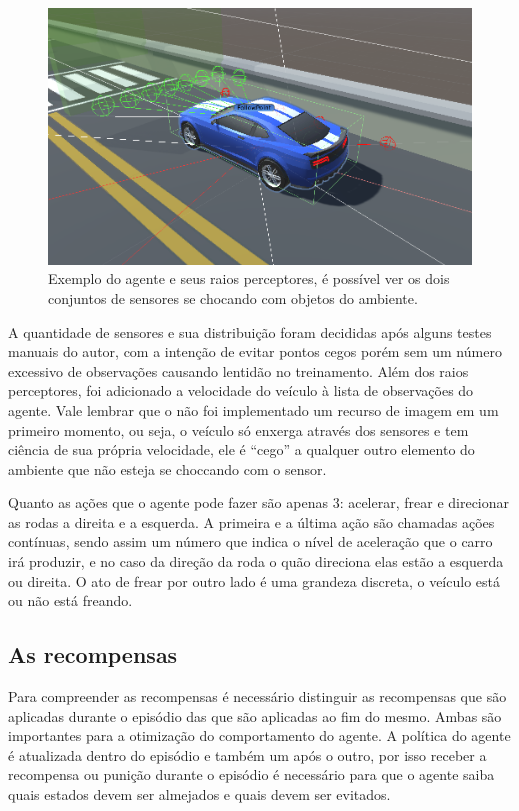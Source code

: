  \begin{figure}[h]
   \centering
   \includegraphics[width=15cm]{figs/agente-raios-checkpoint.png}
    \caption{Exemplo do agente e seus raios perceptores, é possível ver os dois conjuntos de sensores se chocando com objetos do ambiente.}
    \label{fig:casting-rays}
 \end{figure}

A quantidade de sensores e sua distribuição foram decididas após alguns testes manuais do autor, com a intenção de evitar pontos cegos porém sem um número excessivo de observações causando lentidão no treinamento. Além dos raios perceptores, foi adicionado a velocidade do veículo à lista de observações do agente. Vale lembrar que o não foi implementado um recurso de imagem em um primeiro momento, ou seja, o veículo só enxerga através dos sensores e tem ciência de sua própria velocidade, ele é ``cego'' a qualquer outro elemento do ambiente que não esteja se choccando com o sensor.

Quanto as ações que o agente pode fazer são apenas 3: acelerar, frear e direcionar as rodas a direita e a esquerda. A primeira e a última ação são chamadas ações contínuas, sendo assim um número que indica o nível de aceleração que o carro irá produzir, e no caso da direção da roda o quão direciona elas estão a esquerda ou direita. O ato de frear por outro lado é uma grandeza discreta, o veículo está ou não está freando.

\subsection{As recompensas}
Para compreender as recompensas é necessário distinguir as recompensas que são aplicadas durante o episódio das que são aplicadas ao fim do mesmo. Ambas são importantes para a otimização do comportamento do agente. A política do agente é atualizada dentro do episódio e também um após o outro, por isso receber a recompensa ou punição durante o episódio é necessário para que o agente saiba quais estados devem ser almejados e quais devem ser evitados.

